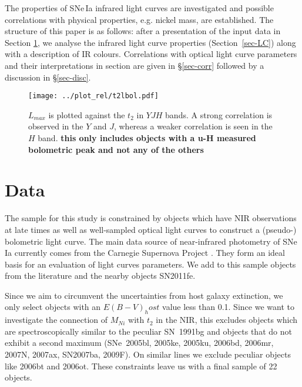 \documentclass{aa}
\begin{document}
The properties of SNe\,Ia infrared light curves are investigated and
possible correlations with physical properties, e.g. nickel mass, are
established. The structure of this paper is as follows: after a
presentation of the input data in Section \ref{sec:data}, we analyse the
infrared light curve properties (Section~\ref{sec-LC}) along with a
description of IR colours. Correlations with optical light curve
parameters and their interpretations in section are given in
\S\ref{sec-corr} followed by a discussion in \S\ref{sec-disc}.

\fi


\begin{figure}
\centering
\texttt{[image: ../plot\_rel/t2lbol.pdf]}
\caption{$L_{max}$ is plotted against the $t_2$ in $YJH$ bands. A strong correlation is observed in the $Y$ and $J$, whereas a weaker correlation is seen in the $H$ band. {\bf this only includes objects with a u-H measured bolometric peak and not any of the others}}
\label{fig:nit2}
\end{figure}



\section{Data} 
\label{sec:data}
%


The sample for this study is constrained by objects which have NIR observations at late times as well as well-sampled optical light curves to
construct a (pseudo-) bolometric light curve. The main data source of
near-infrared photometry of SNe\,Ia currently comes from the Carnegie
Supernova Project \citep[CSP;][]{Contreras2010,Burns2011,Stritzinger2011,Phillips2012,Burns2014}.
They form an ideal basis for an evaluation of light curves parameters.
We add to this sample objects from the literature and the nearby objects SN2011fe.


Since we aim to circumvent the uncertainties from host galaxy extinction, we only select objects with an $E(B-V)_host$ value
less than 0.1. Since we want to investigate the connection of $M_{Ni}$ with $t_2$ in the NIR, this excludes objects which are spectroscopically similar  
to the
peculiar SN~1991bg \citep{Filippenko1992, Leibundgut1993, Mazzali1997} and
objects that do not exhibit a second maximum
(SNe~2005bl, 2005ke, 2005ku, 2006bd, 2006mr, 2007N, 2007ax, SN2007ba,
2009F). On similar lines we exclude peculiar objects like 2006bt and 2006ot. 
These constraints leave us with a final sample of 22 objects. 
\end{document}
